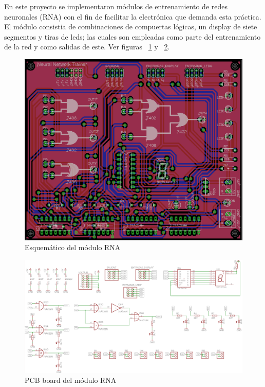 En este proyecto se implementaron módulos de entrenamiento de redes neuronales (RNA) con el fin de facilitar la electrónica que demanda esta práctica. El módulo consistia de combinaciones de compuertas lógicas, un display de siete segmentos y tiras de leds; las cuales son empleadas como parte del entrenamiento de la red y como salidas de este. Ver figuras ~\ref{fig:esquematico-rna} y ~\ref{fig:board-rna}.

\begin{figure}[h!]
  \centering
  \includegraphics[scale=0.36]{images/activities/modulo_rna/rna1.png}
  \caption{Esquemático del módulo RNA}
  \label{fig:esquematico-rna}
\end{figure}

\begin{figure}
  \centering
  \includegraphics[scale=0.3]{images/activities/modulo_rna/rna2.png}
  \caption{PCB board del módulo RNA}
  \label{fig:board-rna}
\end{figure}

